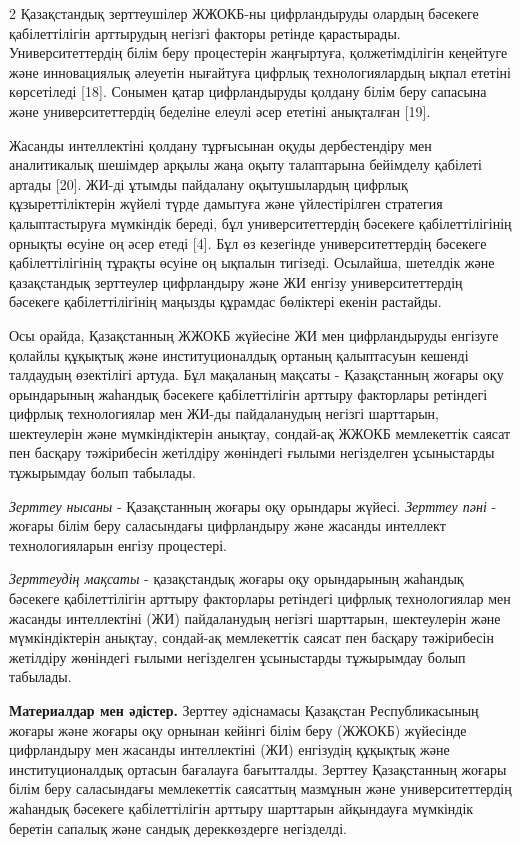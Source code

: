 \begin{multicols}{2}
Қазақстандық зерттеушілер ЖЖОКБ-ны цифрландыруды олардың бәсекеге
қабілеттілігін арттырудың негізгі факторы ретінде қарастырады.
Университеттердің білім беру процестерін жаңғыртуға, қолжетімділігін
кеңейтуге және инновациялық әлеуетін нығайтуға цифрлық технологиялардың
ықпал ететіні көрсетіледі {[}18{]}. Сонымен қатар цифрландыруды қолдану
білім беру сапасына және университеттердің беделіне елеулі әсер ететіні
анықталған {[}19{]}.

Жасанды интеллектіні қолдану тұрғысынан оқуды дербестендіру мен
аналитикалық шешімдер арқылы жаңа оқыту талаптарына бейімделу қабілеті
артады {[}20{]}. ЖИ-ді ұтымды пайдалану оқытушылардың цифрлық
құзыреттіліктерін жүйелі түрде дамытуға және үйлестірілген стратегия
қалыптастыруға мүмкіндік береді, бұл университеттердің бәсекеге
қабілеттілігінің орнықты өсуіне оң әсер етеді {[}4{]}. Бұл өз кезегінде
университеттердің бәсекеге қабілеттілігінің тұрақты өсуіне оң ықпалын
тигізеді. Осылайша, шетелдік және қазақстандық зерттеулер цифрландыру
және ЖИ енгізу университеттердің бәсекеге қабілеттілігінің маңызды
құрамдас бөліктері екенін растайды.

Осы орайда, Қазақстанның ЖЖОКБ жүйесіне ЖИ мен цифрландыруды енгізуге
қолайлы құқықтық және институционалдық ортаның қалыптасуын кешенді
талдаудың өзектілігі артуда. Бұл мақаланың мақсаты - Қазақстанның жоғары
оқу орындарының жаһандық бәсекеге қабілеттілігін арттыру факторлары
ретіндегі цифрлық технологиялар мен ЖИ-ды пайдаланудың негізгі
шарттарын, шектеулерін және мүмкіндіктерін анықтау, сондай-ақ ЖЖОКБ
мемлекеттік саясат пен басқару тәжірибесін жетілдіру жөніндегі ғылыми
негізделген ұсыныстарды тұжырымдау болып табылады.

\emph{Зерттеу нысаны} - Қазақстанның жоғары оқу орындары жүйесі.
\emph{Зерттеу пәні} - жоғары білім беру саласындағы цифрландыру және
жасанды интеллект технологияларын енгізу процестері.

\emph{Зерттеудің мақсаты} - қазақстандық жоғары оқу орындарының жаһандық
бәсекеге қабілеттілігін арттыру факторлары ретіндегі цифрлық
технологиялар мен жасанды интеллектіні (ЖИ) пайдаланудың негізгі
шарттарын, шектеулерін және мүмкіндіктерін анықтау, сондай-ақ
мемлекеттік саясат пен басқару тәжірибесін жетілдіру жөніндегі ғылыми
негізделген ұсыныстарды тұжырымдау болып табылады.

{\bfseries Материалдар мен әдістер.} Зерттеу әдіснамасы Қазақстан
Республикасының жоғары және жоғары оқу орнынан кейінгі білім беру
(ЖЖОКБ) жүйесінде цифрландыру мен жасанды интеллектіні (ЖИ) енгізудің
құқықтық және институционалдық ортасын бағалауға бағытталды. Зерттеу
Қазақстанның жоғары білім беру саласындағы мемлекеттік саясаттың
мазмұнын және университеттердің жаһандық бәсекеге қабілеттілігін арттыру
шарттарын айқындауға мүмкіндік беретін сапалық және сандық дереккөздерге
негізделді.


\end{multicols}
